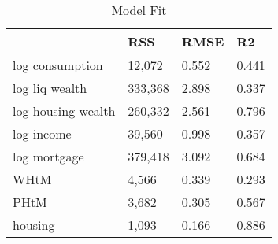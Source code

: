 \begin{table}[htbp]
\caption{\label{clabel} Model Fit}\centering\medskip
\begin{tabular}{llll} \hline \hline
 & RSS  & RMSE  & R2  \\  \hline 
log consumption &    12,072 &     0.552 &     0.441 \\  
log liq wealth &   333,368 &     2.898 &     0.337 \\  
log housing wealth &   260,332 &     2.561 &     0.796 \\  
log income &    39,560 &     0.998 &     0.357 \\  
log mortgage &   379,418 &     3.092 &     0.684 \\  
WHtM &     4,566 &     0.339 &     0.293 \\  
PHtM &     3,682 &     0.305 &     0.567 \\  
housing &     1,093 &     0.166 &     0.886 \\  
\hline \hline \end{tabular}
\end{table}
